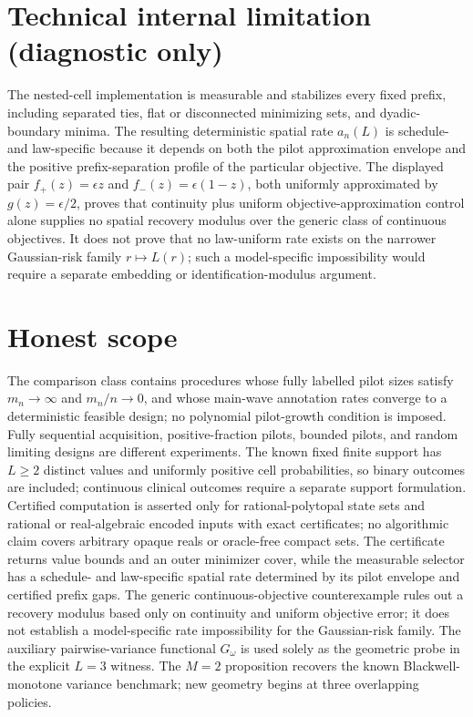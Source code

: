 \documentclass{article}
\begin{document}
\section*{Technical internal limitation (diagnostic only)}

The nested-cell implementation is measurable and stabilizes every fixed prefix, including separated ties, flat or disconnected minimizing sets, and dyadic-boundary minima. The resulting deterministic spatial rate \(a_n(L)\) is schedule- and law-specific because it depends on both the pilot approximation envelope and the positive prefix-separation profile of the particular objective. The displayed pair \(f_+(z)=\epsilon z\) and \(f_-(z)=\epsilon(1-z)\), both uniformly approximated by \(g(z)=\epsilon/2\), proves that continuity plus uniform objective-approximation control alone supplies no spatial recovery modulus over the generic class of continuous objectives. It does not prove that no law-uniform rate exists on the narrower Gaussian-risk family \(r\mapsto L(r)\); such a model-specific impossibility would require a separate embedding or identification-modulus argument.

\section{Honest scope}

The comparison class contains procedures whose fully labelled pilot sizes satisfy \(m_n\to\infty\) and \(m_n/n\to0\), and whose main-wave annotation rates converge to a deterministic feasible design; no polynomial pilot-growth condition is imposed. Fully sequential acquisition, positive-fraction pilots, bounded pilots, and random limiting designs are different experiments. The known fixed finite support has \(L\ge2\) distinct values and uniformly positive cell probabilities, so binary outcomes are included; continuous clinical outcomes require a separate support formulation. Certified computation is asserted only for rational-polytopal state sets and rational or real-algebraic encoded inputs with exact certificates; no algorithmic claim covers arbitrary opaque reals or oracle-free compact sets. The certificate returns value bounds and an outer minimizer cover, while the measurable selector has a schedule- and law-specific spatial rate determined by its pilot envelope and certified prefix gaps. The generic continuous-objective counterexample rules out a recovery modulus based only on continuity and uniform objective error; it does not establish a model-specific rate impossibility for the Gaussian-risk family. The auxiliary pairwise-variance functional \(G_\omega\) is used solely as the geometric probe in the explicit \(L=3\) witness. The \(M=2\) proposition recovers the known Blackwell-monotone variance benchmark; new geometry begins at three overlapping policies.
\end{document}
